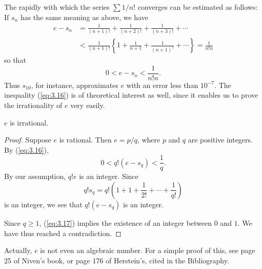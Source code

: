 The rapidly with which the series $\sum 1/n!$ converges can be estimated as follows: If $s_n$ has the same meaning as above, we have
\begin{align*}
    e - s_n
     & = \frac{1}{(n+1)!}
    + \frac{1}{(n+2)!}
    + \frac{1}{(n+3)!}
    + \cdots                     \\
     & < \frac{1}{(n+1)!}\left\{
    1
    + \frac{1}{n+1}
    + \frac{1}{(n+1)^2}
    + \cdots
    \right\} = \frac{1}{n!n}
\end{align*}
so that
\begin{equation}
    \label{eq:3.16}
    0 < e - s_n < \frac{1}{n!n}.
\end{equation}
Thus $s_{10}$, for instance, approximates $e$ with an error less than $10^{-7}$.
The inequality (\ref{eq:3.16}) is of theoretical interest as well, since it enables us to prove the irrationality of $e$ very easily.

\begin{thm}
    \label{thm:3.32}
    $e$ is irrational.
\end{thm}

\begin{proof}
    Suppose $e$ is rational. Then $e = p/q$, where $p$ and $q$ are positive integers.
    By (\ref{eq:3.16}),
    \begin{equation}
        \label{eq:3.17}
        0<q!(e-s_q)<\frac{1}{q}.
    \end{equation}
    By our assumption, $q!e$ is an integer. Since
    \begin{equation*}
        q!s_q =
        q!\left(
        1 + 1 + \frac{1}{2!} + \cdots + \frac{1}{q!}
        \right)
    \end{equation*}
    is an integer, we see that $q!(e-s_q)$ is an integer.

    Since $q \geq 1$, (\ref{eq:3.17}) implies the existence of an integer between $0$ and $1$. We have thus reached a contradiction.
\end{proof}

Actually, $e$ is not even an algebraic number.
For a simple proof of this, see page 25 of Niven's\cite{NIVEN1956} book, or page 176 of Herstein's\cite{HERSTEIN1964}, cited in the Bibliography.
